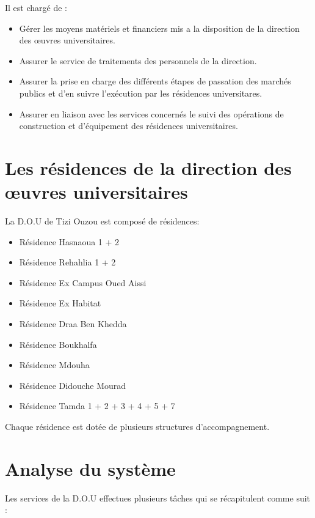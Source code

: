         Il est chargé de :
        \begin{itemize}\renewcommand{\labelitemi}{$\bullet$}
            \item Gérer les moyens matériels et financiers mis a la disposition de la direction des œuvres universitaires.
            \item Assurer le service de traitements des personnels de la direction.
            \item Assurer la prise en charge des différents étapes de passation des marchés publics et d'en suivre l'exécution par les résidences universitares.
            \item Assurer en liaison avec les services concernés le suivi des  opérations de construction et d'équipement des résidences universitaires.\\
        \end{itemize}

\section{Les résidences de la direction des œuvres universitaires}
    La \acs{D.O.U} de Tizi Ouzou est composé de résidences:
    \begin{itemize}
        \item Résidence Hasnaoua 1 + 2
        \item Résidence Rehahlia 1 + 2
        \item Résidence Ex Campus Oued Aissi
        \item Résidence Ex Habitat
        \item Résidence Draa Ben Khedda
        \item Résidence Boukhalfa
        \item Résidence Mdouha
        \item Résidence Didouche Mourad
        \item Résidence Tamda 1 + 2 + 3 + 4 + 5 + 7
    \end{itemize}
    Chaque résidence est dotée de plusieurs structures d’accompagnement.\\

\section{Analyse du système}
    Les services de la \acs{D.O.U} effectues plusieurs tâches qui se récapitulent comme suit :


